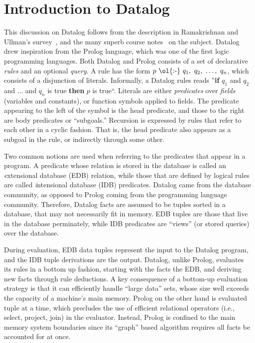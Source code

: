 \section{Introduction to Datalog}
\label{ch:p2:sec:datalog}

This discussion on Datalog follows from the description in Ramakrishnan and
Ullman's survey~\cite{deductive-database}, and the many superb course
notes~\cite{ullmanNotes} on the subject.  Datalog drew inspiration from the
Prolog language, which was one of the first logic programming languages.  Both
Datalog and Prolog consists of a set of declarative {\em rules} and an optional
{\em query}.  A rule has the form $p\ \text{\ol{:-}}\ q_1,\ q_2,\ \ldots,\ q_n$, which consists
of a disjunction of literals.  Informally, a Datalog rules reads ''{\bf if}
$q_1$ and $q_2$ and $\ldots$ and $q_n$ is true {\bf then} $p$ is true``.
Literals are either {\em predicates} over {\em fields} (variables and
constants), or function symbols applied to fields.  The predicate appearing to
the left of the \ol{:-} symbol is the head predicate, and those to the right
are body predicates or ``subgoals.'' Recursion is expressed by rules that refer
to each other in a cyclic fashion.  That is, the head predicate also appears as
a subgoal in the rule, or indirectly through some other.

Two common notions are used when referring to the predicates that appear in a
program.  A predicate whose relation is stored in the database is called an
{\emph extensional database} (EDB) relation, while those that are defined by
logical rules are called {\emph intensional database} (IDB) predicates.  Datalog
came from the database community, as opposed to Prolog coming from the programming
language community. Therefore, Datalog facts are assumed to be tuples sorted in
a database, that may not necessarily fit in memory. EDB tuples are those that live
in the database perminately, while IDB predicates are ``views'' (or stored
queries) over the database. 

During evaluation, EDB data tuples represent the input to the Datalog program,
and the IDB tuple derivations are the output.  Datalog, unlike Prolog,
evaluates its rules in a bottom up fashion, starting with the facts the EDB,
and deriving new facts through rule deductions.  A key consequence of a
bottom-up evaluation strategy is that it can efficiently handle ``large data''
sets, whose size well exceeds the capacity of a machine's main memory.  Prolog
on the other hand is evaluated tuple at a time, which precludes the use of
efficient relational operators (i.e., select, project, join) in the evaluator.
Instead, Prolog is confined to the main memory system boundaries since its
``graph'' based algorithm requires all facts be accounted for at once.

